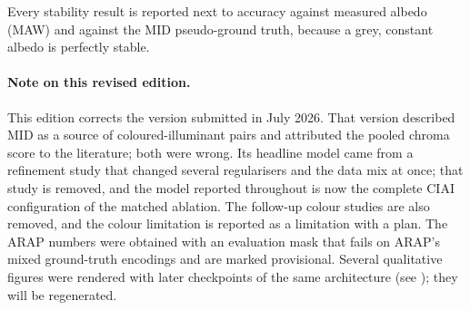 Every stability result is reported next to accuracy against measured albedo (MAW) and
against the MID pseudo-ground truth, because a grey, constant albedo is perfectly stable.

\paragraph*{Note on this revised edition.}
This edition corrects the version submitted in July 2026. That version described MID as a
source of coloured-illuminant pairs and attributed the pooled chroma score to the
literature; both were wrong. Its headline model came from a refinement study that changed
several regularisers and the data mix at once; that study is removed, and the model
reported throughout is now the complete CIAI configuration of the matched ablation. The
follow-up colour studies are also removed, and the colour limitation is reported as a
limitation with a plan. The ARAP numbers were obtained with an evaluation mask that fails on
ARAP's mixed ground-truth encodings and are marked provisional. Several qualitative figures
were rendered with later checkpoints of the same architecture (see );
they will be regenerated.
